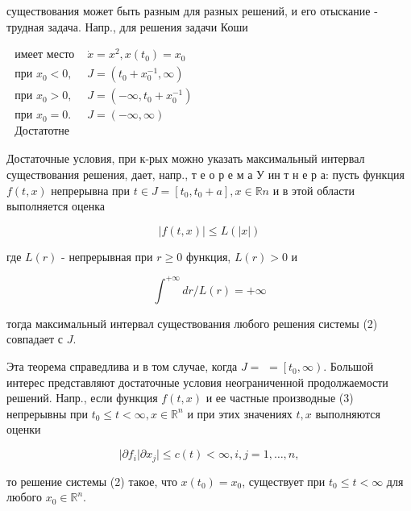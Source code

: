 \documentclass[10pt]{article}
\begin{document}
существования может быть разным для разных решений, и его отыскание - трудная задача. Напр., для решения задачи Коши



$\begin{array}{lc}\text { имеет место } & \dot{x}=x^{2}, x\left(t_{0}\right)=x_{0} \\ \text { при } x_{0}<0, & J=\left(t_{0}+x_{0}^{-1}, \infty\right) \\ \text { при } x_{0}>0, & J=\left(-\infty, t_{0}+x_{0}^{-1}\right) \\ \text { при } x_{0}=0 . & J=(-\infty, \infty) \\ \text { Достатотне } & \end{array}$



Достаточные условия, при к-рых можно указать максимальный интервал существования решения, дает, напр., т е о р е м а У ин т н е р а: пусть функция $f(t, x)$ непрерывна при $t \in J=\left[t_{0}, t_{0}+a\right], x \in \mathbb{R} n$ и в этой области выполняется оценка



\[

|f(t, x)| \leqslant L(|x|)

\]



где $L(r)$ - непрерывная при $r \geqslant 0$ функция, $L(r)>0$ и



\[

\int^{+\infty} d r / L(r)=+\infty

\]



тогда максимальный интервал существования любого решения системы (2) совпадает с $J$.



Эта теорема справедлива и в том случае, когда $J=$ $=\left[t_{0}, \infty\right)$. Большой интерес представляют достаточные условия неограниченной продолжаемости решений. Напр., если функция $f(t, x)$ и ее частные производные (3) непрерывны при $t_{0} \leqslant t<\infty, x \in \mathbb{R}^{n}$ и при этих значениях $t, x$ выполняются оценки



\[

\left|\partial f_{i}\right| \partial x_{j} \mid \leqslant c(t)<\infty, i, j=1, \ldots, n,

\]



то решение системы (2) такое, что $x\left(t_{0}\right)=x_{0}$, существует при $t_{0} \leqslant t<\infty$ для любого $x_{0} \in \mathbb{R}^{n}$.
\end{document}
